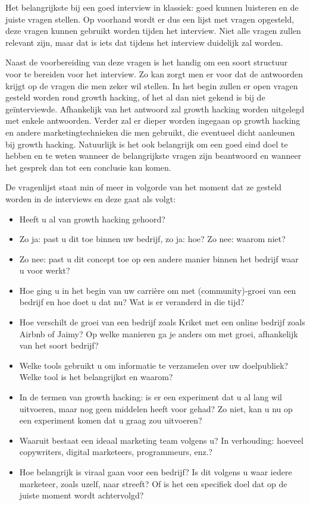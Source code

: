 Het belangrijkste bij een goed interview in klassiek: goed kunnen luisteren en de juiste vragen stellen. Op voorhand wordt er dus een lijst met vragen opgesteld, deze vragen kunnen gebruikt worden tijden het interview. Niet alle vragen zullen relevant zijn, maar dat is iets dat tijdens het interview duidelijk zal worden.

Naast de voorbereiding van deze vragen is het handig om een soort structuur voor te bereiden voor het interview. Zo kan zorgt men er voor dat de antwoorden krijgt op de vragen die men zeker wil stellen. In het begin zullen er open vragen gesteld worden rond growth hacking, of het al dan niet gekend is bij de geïnterviewde. Afhankelijk van het antwoord zal growth hacking worden uitgelegd met enkele antwoorden. Verder zal er dieper worden ingegaan op growth hacking en andere marketingtechnieken die men gebruikt, die eventueel dicht aanleunen bij growth hacking. Natuurlijk is het ook belangrijk om een goed eind doel te hebben en te weten wanneer de belangrijkste vragen zijn beantwoord en wanneer het gesprek dan tot een conclusie kan komen.

De vragenlijst staat min of meer in volgorde van het moment dat ze gesteld worden in de interviews en deze gaat als volgt:
\begin{itemize} 
	\item Heeft u al van growth hacking gehoord?
	\item Zo ja: past u dit toe binnen uw bedrijf, zo ja: hoe? Zo nee: waarom niet?
	\item Zo nee: past u dit concept toe op een andere manier binnen het bedrijf waar u voor werkt?
	\item Hoe ging u in het begin van uw carrière om met (community)-groei van een bedrijf en hoe doet u dat nu? Wat is er veranderd in die tijd?
	\item Hoe verschilt de groei van een bedrijf zoals Kriket met een online bedrijf zoals Airbnb of Jaimy? Op welke manieren ga je anders om met groei, afhankelijk van het soort bedrijf?
	\item Welke tools gebruikt u om informatie te verzamelen over uw doelpubliek? Welke tool is het belangrijkst en waarom?
	\item In de termen van growth hacking: is er een experiment dat u al lang wil uitvoeren, maar nog geen middelen heeft voor gehad? Zo niet, kan u nu op een experiment komen dat u graag zou uitvoeren?
	\item Waaruit bestaat een ideaal marketing team volgens u? In verhouding: hoeveel copywriters, digital marketeers, programmeurs, enz.?
	\item Hoe belangrijk is viraal gaan voor een bedrijf? Is dit volgens u waar iedere marketeer, zoals uzelf, naar streeft? Of is het een specifiek doel dat op de juiste moment wordt achtervolgd? 
\end{itemize}

